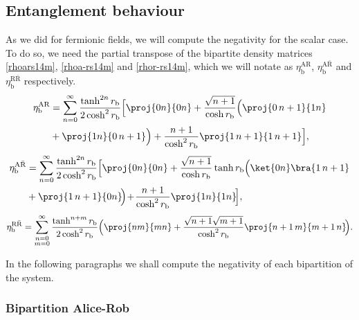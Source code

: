 \subsection{Entanglement behaviour}\label{negatsecm4}

 As we did for fermionic fields, we will compute the negativity for the scalar case.  To do so, we need the partial transpose of the bipartite density matrices \eqref{rhoars14m}, \eqref{rhoa-rs14m} and \eqref{rhor-rs14m}, which we will notate as $\eta^\text{AR}_\text{b}$, $\eta^{\text{A}{\bar{\text{R}}}}_\text{b}$ and $\eta^{\text{R}{\bar{\text{R}}}}_\text{b}$  respectively.
\begin{align}\label{etaARs4m}
\eta^\text{AR}_\text{b}&=\sum_{n=0}^{\infty}\frac{\tanh^{2n}r_\text{b}}{2\cosh^2 r_\text{b}}\Big[\proj{0n}{0n}+\frac{\sqrt{n+1}}{\cosh r_\text{b}}\Big(\proj{0\, n+1}{1n}\nonumber\\*
&+\proj{1 n}{0\,n+1}\Big)+\frac{n+1}{\cosh^2 r_\text{b}}\proj{1\,n+1}{1\,n+1}\Big],
\end{align}
\begin{align}\label{etaAaRs4m}
\nonumber\eta^{\text{A}{\bar{\text{R}}}}_\text{b}&=\sum_{n=0}^{\infty}\frac{\tanh^{2n}r_\text{b}}{2\cosh^2 r_\text{b}}\Big[\proj{0n}{0n}+\frac{\sqrt{n+1}}{\cosh r_\text{b}}\tanh r_\text{b}\Big(\ket{0 n}\bra{1\, n+1}\\*
&+\proj{1\, n+1}{0n}\!\Big)\!+\!\frac{n+1}{\cosh^2 r_\text{b}}\proj{1n}{1n}\!\Big],
\end{align}
\begin{equation}\label{etaRaRs4m}
\eta^{\text{R}{\bar{\text{R}}}}_\text{b}=\sum_{\substack{n=0\\m=0}}^{\infty}\frac{\tanh^{n+m}r_\text{b}}{2\cosh^2 r_\text{b}}\Big(\proj{nm}{mn}+\frac{\sqrt{n+1}\sqrt{m+1}}{\cosh^2 r_\text{b}}\proj{n+1\,m}{m+1\,n}\!\Big).
\end{equation}

In the following paragraphs we shall compute the negativity of each bipartition of the system.
 
\subsubsection{Bipartition Alice-Rob}


